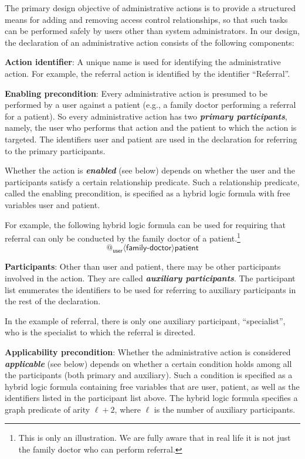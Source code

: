 \documentclass{acm_proc_article-sp}
\newcommand{\Dfn}[1]{\textbf{\emph{#1}}}
\begin{document}
The primary design objective of administrative actions is to provide a
structured means for adding and removing access control relationships,
so that such tasks can be performed safely by users other than system
administrators.  In our design, the declaration of an administrative
action consists of the following components:
\begin{compactitem}
\item \textbf{Action identifier}: A unique name is used for
  identifying the administrative action.  For example, the
  referral action is identified by the identifier 
  ``\textsf{Referral}''.
\item \textbf{Enabling precondition}: Every administrative action is
  presumed to be performed by a user against a patient (e.g., a family
  doctor performing a referral for a patient).  So every
  administrative action has two \Dfn{primary participants}, namely,
  the user who performs that action and the patient to which the
  action is targeted.  The identifiers \textsf{user} and
  \textsf{patient} are used in the declaration for referring to
  the primary participants.

  Whether the action is \Dfn{enabled} (see below) depends on whether
  the user and the participants satisfy a certain relationship
  predicate.  Such a relationship predicate, called the enabling
  precondition, is specified as a hybrid logic formula with free
  variables \textsf{user} and \textsf{patient}.

  For example, the following hybrid logic formula can be
  used for requiring that referral can only be conducted
  by the family doctor of a patient.\footnote{This is only
  an illustration. We are fully aware that in real life
  it is not just the family doctor who can perform referral.}
\[
   @_{\mathsf{user}} \langle \mathsf{family}\text{-}\mathsf{doctor}
    \rangle \mathsf{patient}
\]
\item \textbf{Participants}: Other than \textsf{user} and
  \textsf{patient}, there may be other participants involved in the
  action.  They are called \Dfn{auxiliary participants}.  The
  participant list enumerates the identifiers to be used for referring
  to auxiliary participants in the rest of the declaration.

  In the example of referral, there is only one auxiliary 
  participant, ``\textsf{specialist}'', who is the specialist
  to which the referral is directed.
\item \textbf{Applicability precondition}: Whether the administrative
  action is considered \Dfn{applicable} (see below) depends on whether
  a certain condition holds among all the participants (both primary
  and auxiliary).  Such a condition is specified as a hybrid logic
  formula containing free variables that are \textsf{user},
  \textsf{patient}, as well as the identifiers listed in the
  participant list above.  The hybrid logic formula specifies
  a graph predicate of arity $\ell + 2$, where $\ell$ is the
  number of auxiliary participants.


\end{compactitem}
\end{document}
